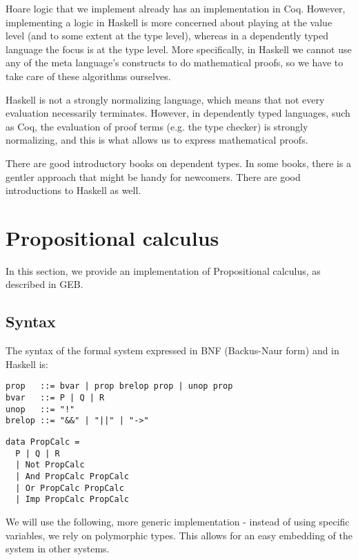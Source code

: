 \documentclass{article}
\begin{document}
Hoare logic that we implement already has an implementation in Coq\cite{b3}. However, implementing a logic in Haskell is more concerned about playing at the value level (and to some extent at the type level), whereas in a dependently typed language the focus is at the type level. More specifically, in Haskell we cannot use any of the meta language's constructs to do mathematical proofs, so we have to take care of these algorithms ourselves.

Haskell is not a strongly normalizing language, which means that not every evaluation necessarily terminates. However, in dependently typed languages, such as Coq\cite{b4}, the evaluation of proof terms (e.g. the type checker) is strongly normalizing, and this is what allows us to express mathematical proofs.

There are good introductory books on dependent types\cite{b3}. In some books, there is a gentler approach that might be handy for newcomers\cite{b5}. There are good introductions to Haskell as well\cite{b6}.

\section{Propositional calculus}

In this section, we provide an implementation of Propositional calculus, as described in GEB\cite{b7}.

\subsection{Syntax}

The syntax of the formal system expressed in BNF (Backus-Naur form) and in Haskell is:

\begin{minipage}{0.49\textwidth}
\begin{lstlisting}
prop   ::= bvar | prop brelop prop | unop prop
bvar   ::= P | Q | R
unop   ::= "!"
brelop ::= "&&" | "||" | "->"
\end{lstlisting}
\end{minipage}
\begin{minipage}{0.49\textwidth}
\begin{lstlisting}
data PropCalc =
  P | Q | R
  | Not PropCalc
  | And PropCalc PropCalc
  | Or PropCalc PropCalc
  | Imp PropCalc PropCalc
\end{lstlisting}
\end{minipage}

We will use the following, more generic implementation - instead of using specific variables, we rely on polymorphic types. This allows for an easy embedding of the system in other systems.
\end{document}
